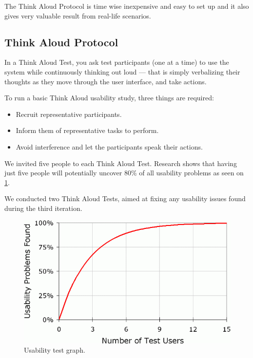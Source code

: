 The Think Aloud Protocol is time wise inexpensive and easy to set up and it also gives very valuable result from real-life scenarios.

\subsection{Think Aloud Protocol}
In a Think Aloud Test, you ask test participants (one at a time) to use the system while continuously thinking out loud --- that is  simply verbalizing their thoughts as they move through the user interface, and take actions.

To run a basic Think Aloud usability study, three things are required:

\begin{itemize}
\item Recruit representative participants.
\item Inform them of representative tasks to perform.
\item Avoid interference and let the participants speak their actions.
\end{itemize}

We invited five people to each Think Aloud Test. Research shows that having just five people will potentially uncover 80\% of all usability problems \cite{jakobnielsen2000fiveusers} as seen on \ref{fig:usabilitycurve}.

We conducted two Think Aloud Tests, aimed at fixing any usability issues found during the third iteration.

\begin{figure}[ht]
\centering
\includegraphics[width=\columnwidth]{usabilitycurve.png}
\caption{Usability test graph.}
\label{fig:usabilitycurve}
\end{figure}

